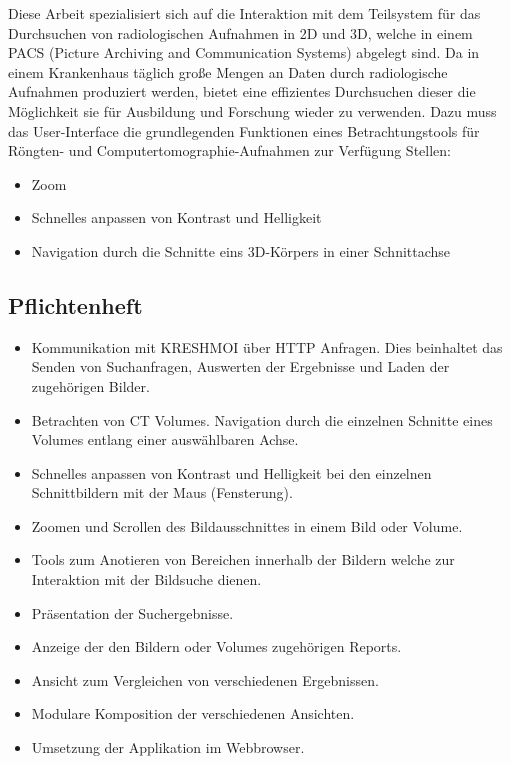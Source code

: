Diese Arbeit spezialisiert sich auf die Interaktion mit dem Teilsystem für das Durchsuchen von radiologischen Aufnahmen in 2D und 3D,
welche in einem PACS (Picture Archiving and Communication Systems) abgelegt sind.
Da in einem Krankenhaus täglich große Mengen an Daten durch radiologische Aufnahmen produziert werden, 
bietet eine effizientes Durchsuchen dieser die Möglichkeit  sie für Ausbildung und Forschung wieder zu verwenden.
%
Dazu muss das User-Interface die grundlegenden Funktionen eines Betrachtungstools für Röngten- und Computertomographie-Aufnahmen zur Verfügung Stellen:
\begin{itemize}
	\item Zoom
	\item Schnelles anpassen von Kontrast und Helligkeit
	\item Navigation durch die Schnitte eins 3D-Körpers in einer Schnittachse
\end{itemize}
\cite{pacs}


\subsection{Pflichtenheft}
\label{sec:Pflichtenheft}
\begin{itemize}
	\item Kommunikation mit KRESHMOI über HTTP Anfragen. Dies beinhaltet das Senden von Suchanfragen, Auswerten der Ergebnisse und Laden der zugehörigen Bilder.
	\item Betrachten von CT Volumes. Navigation durch die einzelnen Schnitte eines Volumes entlang einer auswählbaren Achse.
	\item Schnelles anpassen von Kontrast und Helligkeit bei den einzelnen Schnittbildern mit der Maus (Fensterung).
	\item Zoomen und Scrollen des Bildausschnittes in einem Bild oder Volume.
	\item Tools zum Anotieren von Bereichen innerhalb der Bildern welche zur Interaktion mit der Bildsuche dienen.
	\item Präsentation der Suchergebnisse.
	\item Anzeige der den Bildern oder Volumes zugehörigen Reports.
	\item Ansicht zum Vergleichen von verschiedenen Ergebnissen.
	\item Modulare Komposition der verschiedenen Ansichten.
	\item Umsetzung der Applikation im Webbrowser.
\end{itemize}

